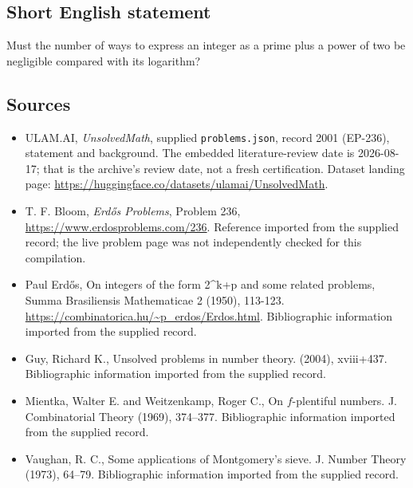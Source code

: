 \documentclass[11pt,a4paper]{article}
\begin{document}
\subsection{Short English statement}

Must the number of ways to express an integer as a prime plus a power of two be negligible compared with its logarithm?

\subsection{Sources}

{\small

\begin{itemize}

\item[\hypertarget{source:2001:1}{S1}] ULAM.AI, \emph{UnsolvedMath}, supplied \texttt{problems.json}, record 2001 (EP-236), statement and background. The embedded literature-review date is 2026-08-17; that is the archive’s review date, not a fresh certification. Dataset landing page: \url{https://huggingface.co/datasets/ulamai/UnsolvedMath}.

\item[\hypertarget{source:2001:2}{S2}] T. F. Bloom, \emph{Erdős Problems}, Problem 236, \url{https://www.erdosproblems.com/236}. Reference imported from the supplied record; the live problem page was not independently checked for this compilation.

\item[\hypertarget{source:2001:3}{S3}] Paul Erdős, On integers of the form 2\textasciicircum{}k+p and some related problems, Summa Brasiliensis Mathematicae 2 (1950), 113-123. \url{https://combinatorica.hu/~p_erdos/Erdos.html}. Bibliographic information imported from the supplied record.

\item[\hypertarget{source:2001:4}{S4}] Guy, Richard K., Unsolved problems in number theory. (2004), xviii+437. Bibliographic information imported from the supplied record.

\item[\hypertarget{source:2001:5}{S5}] Mientka, Walter E. and Weitzenkamp, Roger C., On {$f$}-plentiful numbers. J. Combinatorial Theory (1969), 374--377. Bibliographic information imported from the supplied record.

\item[\hypertarget{source:2001:6}{S6}] Vaughan, R. C., Some applications of {M}ontgomery's sieve. J. Number Theory (1973), 64--79. Bibliographic information imported from the supplied record.

\end{itemize}

}

\label{end:2001}
\end{document}
